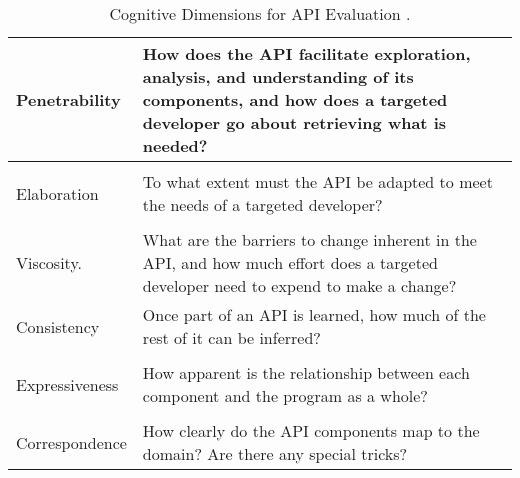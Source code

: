 \begin{table}[]
{\begin{tabularx}{\textwidth}{|l|X|}
Penetrability                                                    & How does the API facilitate exploration, analysis, and understanding of its components, and how does a targeted developer go about retrieving what is needed? \\ \hline
\begin{tabular}[c]{@{}l@{}}API\\ Elaboration\end{tabular}        & To what extent must the API be adapted to meet the needs of a targeted developer?                                                                             \\ \hline
\begin{tabular}[c]{@{}l@{}}API\\ Viscosity.\end{tabular}         & What are the barriers to change inherent in the API, and how much effort does a targeted developer need to expend to make a change?                           \\ \hline
Consistency                                                      & Once part of an API is learned, how much of the rest of it can be inferred?                                                                                   \\ \hline
\begin{tabular}[c]{@{}l@{}}Role\\ Expressiveness\end{tabular}    & How apparent is the relationship between each component and the program as a whole?                                                                           \\ \hline
\begin{tabular}[c]{@{}l@{}}Domain\\ Correspondence\end{tabular}  & How clearly do the API components map to the domain? Are there any special tricks?                                                                            \\ \hline
\end{tabularx}%
}
\caption{Cognitive Dimensions for \gls{API} Evaluation \cite{clarke2003using}.}
\label{tab:cogdims}
\end{table}

